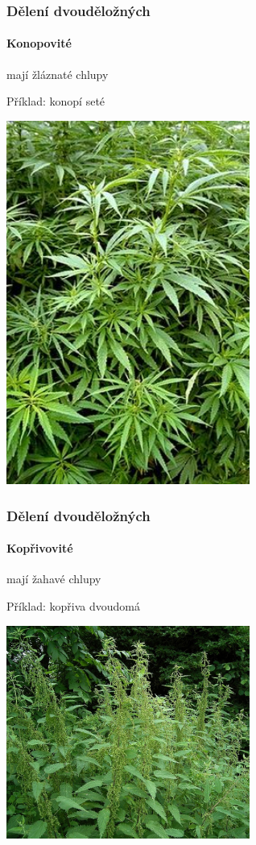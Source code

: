 \documentclass{beamer}
\begin{document}
\begin{frame}
\frametitle{Dělení dvouděložných}
	\framesubtitle{Konopovité}mají žláznaté chlupy

Příklad: konopí seté

\begin{center}\includegraphics[width=8cm]{268px-Cannabis_sativa.jpg}\end{center}
\end{frame}
\begin{frame}
\frametitle{Dělení dvouděložných}
	\framesubtitle{Kopřivovité}mají žahavé chlupy

Příklad: kopřiva dvoudomá

\begin{center}\includegraphics[width=8cm]{Urtica_dioica06_ies.jpg}\end{center}
\end{frame}
\end{document}
